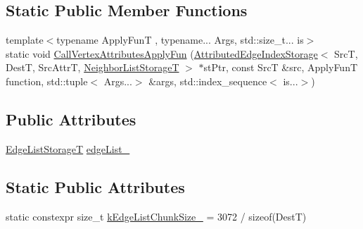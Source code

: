 \subsection*{Static Public Member Functions}
\begin{DoxyCompactItemize}
\item 
{\footnotesize template$<$typename Apply\-Fun\-T , typename... Args, std\-::size\-\_\-t... is$>$ }\\static void \hyperlink{classshad_1_1AttributedEdgeIndexStorage_a7bca59f814fc8a2a78d99247c18466f6}{Call\-Vertex\-Attributes\-Apply\-Fun} (\hyperlink{classshad_1_1AttributedEdgeIndexStorage}{Attributed\-Edge\-Index\-Storage}$<$ Src\-T, Dest\-T, Src\-Attr\-T, \hyperlink{classshad_1_1AttributedEdgeIndexStorage_a496b746cebb44b3675c14c22531f6bc5}{Neighbor\-List\-Storage\-T} $>$ $\ast$st\-Ptr, const Src\-T \&src, Apply\-Fun\-T function, std\-::tuple$<$ Args...$>$ \&args, std\-::index\-\_\-sequence$<$ is...$>$)
\end{DoxyCompactItemize}
\subsection*{Public Attributes}
\begin{DoxyCompactItemize}
\item 
\hyperlink{classshad_1_1AttributedEdgeIndexStorage_ae0e7b167b48bf7a96060a37ae0bb2feb}{Edge\-List\-Storage\-T} \hyperlink{classshad_1_1AttributedEdgeIndexStorage_a9b75c33790c1e4fc755dba28371fbe7b}{edge\-List\-\_\-}
\end{DoxyCompactItemize}
\subsection*{Static Public Attributes}
\begin{DoxyCompactItemize}
\item 
static constexpr size\-\_\-t \hyperlink{classshad_1_1AttributedEdgeIndexStorage_a25f1c4ea3b8065bccaa587576d29e262}{k\-Edge\-List\-Chunk\-Size\-\_\-} = 3072 / sizeof(Dest\-T)
\end{DoxyCompactItemize}


